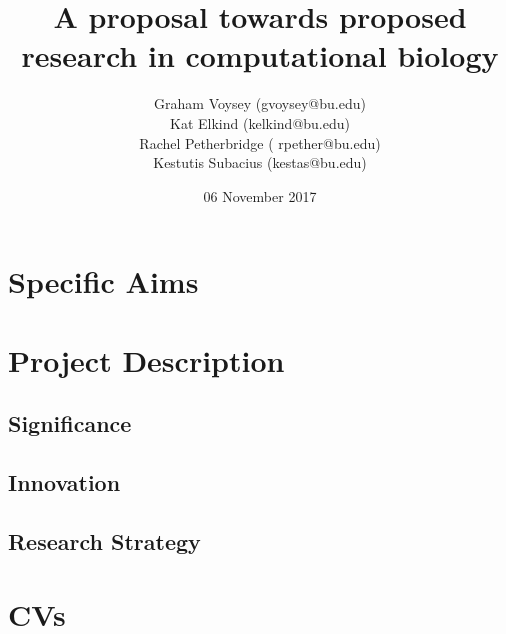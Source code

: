\documentclass{article}
\begin{document}
\title{A proposal towards proposed research in computational biology}
\date{06 November 2017}
\author{Graham Voysey (gvoysey@bu.edu)\\Kat Elkind (kelkind@bu.edu)\\Rachel Petherbridge (
    rpether@bu.edu)\\Kestutis Subacius (kestas@bu.edu)}
\maketitle
\section{Specific Aims}

\section{Project Description}

	\subsection{Significance}

	\subsection{Innovation}

	\subsection{Research Strategy}

\section{CVs}

\end{document}
